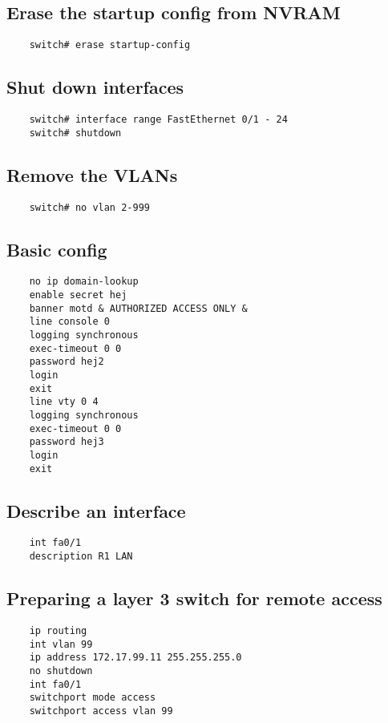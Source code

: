 \documentclass{article}
\begin{document}
\subsection{Erase the startup config from NVRAM}
\begin{verbatim}
	switch# erase startup-config
\end{verbatim}

\subsection{Shut down interfaces}
\begin{verbatim}
	switch# interface range FastEthernet 0/1 - 24
	switch# shutdown
\end{verbatim}

\subsection{Remove the VLANs}
\begin{verbatim}
	switch# no vlan 2-999
\end{verbatim}

\subsection{Basic config}
\begin{verbatim}
	no ip domain-lookup
	enable secret hej
	banner motd & AUTHORIZED ACCESS ONLY &
	line console 0
	logging synchronous
	exec-timeout 0 0
	password hej2
	login
	exit
	line vty 0 4
	logging synchronous
	exec-timeout 0 0
	password hej3
	login
	exit
\end{verbatim}

\subsection{Describe an interface}
\begin{verbatim}
	int fa0/1
	description R1 LAN
\end{verbatim}

\subsection{Preparing a layer 3 switch for remote access}

\begin{verbatim}
	ip routing
	int vlan 99
	ip address 172.17.99.11 255.255.255.0
	no shutdown
	int fa0/1
	switchport mode access
	switchport access vlan 99
\end{verbatim}
\end{document}
